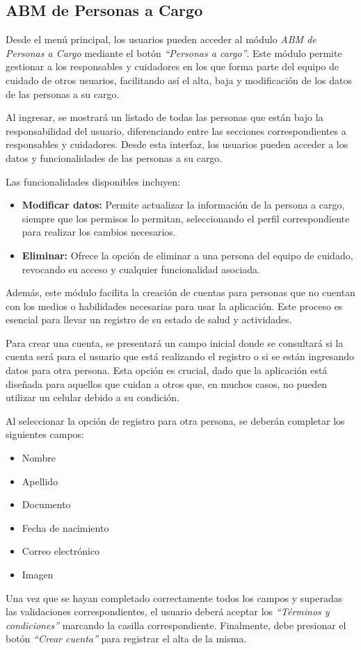 \documentclass[a4paper,12pt]{article}
\begin{document}
    \subsection{ABM de Personas a Cargo}
    \par Desde el menú principal, los usuarios pueden acceder al módulo \textit{ABM de Personas a Cargo} mediante el botón \textit{“Personas a cargo”}. Este módulo permite gestionar a los responsables y cuidadores en los que forma parte del equipo de cuidado de otros usuarios, facilitando así el alta, baja y modificación de los datos de las personas a su cargo.
    \par Al ingresar, se mostrará un listado de todas las personas que están bajo la responsabilidad del usuario, diferenciando entre las secciones correspondientes a responsables y cuidadores. Desde esta interfaz, los usuarios pueden acceder a los datos y funcionalidades de las personas a su cargo.
    \par Las funcionalidades disponibles incluyen:
    \begin{itemize}
        \item \textbf{Modificar datos:} Permite actualizar la información de la persona a cargo, siempre que los permisos lo permitan, seleccionando el perfil correspondiente para realizar los cambios necesarios.
        \item \textbf{Eliminar:} Ofrece la opción de eliminar a una persona del equipo de cuidado, revocando su acceso y cualquier funcionalidad asociada.
    \end{itemize}
    \par Además, este módulo facilita la creación de cuentas para personas que no cuentan con los medios o habilidades necesarias para usar la aplicación. Este proceso es esencial para llevar un registro de su estado de salud y actividades.
    \par Para crear una cuenta, se presentará un campo inicial donde se consultará si la cuenta será para el usuario que está realizando el registro o si se están ingresando datos para otra persona. Esta opción es crucial, dado que la aplicación está diseñada para aquellos que cuidan a otros que, en muchos casos, no pueden utilizar un celular debido a su condición.
    \par Al seleccionar la opción de registro para otra persona, se deberán completar los siguientes campos:
    \begin{itemize}
        \item Nombre
        \item Apellido
        \item Documento
        \item Fecha de nacimiento
        \item Correo electrónico
        \item Imagen
    \end{itemize}
    \par Una vez que se hayan completado correctamente todos los campos y superadas las validaciones correspondientes, el usuario deberá aceptar los \textit{“Términos y condiciones”} marcando la casilla correspondiente. Finalmente, debe presionar el botón \textit{“Crear cuenta”} para registrar el alta de la misma.
\end{document}
